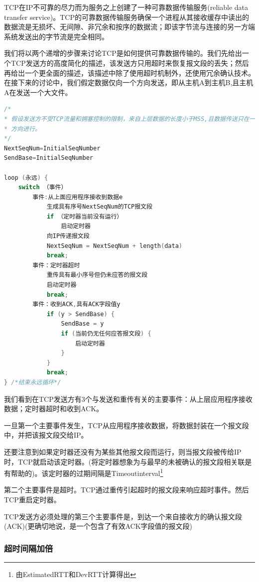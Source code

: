     TCP在IP不可靠的尽力而为服务之上创建了一种可靠数据传输服务(reliable data transfer service)。TCP的可靠数据传输服务确保一个进程从其接收缓存中读出的数据流是无损坏、无间隙、非冗余和按序的数据流；即该字节流与连接的另一方端系统发送出的字节流是完全相同。

    我们将以两个递增的步骤来讨论TCP是如何提供可靠数据传输的。我们先给出一个TCP发送方的高度简化的描述，该发送方只用超时来恢复报文段的丢失；然后再给岀一个更全面的描述，该描述中除了使用超时机制外，还使用冗余确认技术。在接下来的讨论中，我们假定数据仅向一个方向发送，即从主机A到主机B,且主机A在发送一个大文件。

\begin{lstlisting}[language=C++, caption={简化的TCP发送方}]
/*
* 假设发送方不受TCP流量和拥塞控制的限制，来自上层数据的长度小于MSS,且数据传送只在一个
* 方向进行。
*/
NextSeqNum=InitialSeqNumber
SendBase=InitialSeqNumber

loop (永远) {
    switch （事件）
        事件:从上面应用程序接收到数据e
            生成具有序号NextSeqNum的TCP报文段
            if （定时器当前没有运行）
                启动定时器 
            向IP传递报文段
            NextSeqNum = NextSeqNum + length(data)
            break;
        事件：定时器超时
            重传具有最小序号但仍未应答的报文段
            启动定时器
            break;
        事件：收到ACK,具有ACK字段值y
            if (y > SendBase) {
                SendBase = y
                if (当前仍无任何应答报文段) {
                    启动定时器 
                }
            }
            break;
} /*结束永远循环*/
\end{lstlisting}

    我们看到在TCP发送方有3个与发送和重传有关的主要事件：从上层应用程序接收数据；定时器超时和收到ACK。

    一旦第一个主要事件发生，TCP从应用程序接收数据，将数据封装在一个报文段中，并把该报文段交给IP。

    还要注意到如果定时器还没有为某些其他报文段而运行，则当报文段被传给IP时，TCP就启动该定时器。(将定时器想象为与最早的未被确认的报文段相关联是有帮助的)。该定时器的过期间隔是Timeoutinterval\footnote[1]{由EstimatedRTT和DevRTT计算得出}

    第二个主要事件是超时。TCP通过重传引起超时的报文段来响应超时事件。然后TCP重启定时器。

    TCP发送方必须处理的第三个主要事件是，到达一个来自接收方的确认报文段(ACK)(更确切地说，是一个包含了有效ACK字段值的报文段)

\subsubsection{超时间隔加倍}

